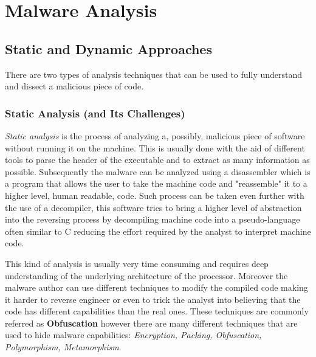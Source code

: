 
\chapter{Malware Analysis}


\section{Static and Dynamic Approaches}
There are two types of analysis techniques that can be used to fully understand and dissect a malicious piece of code.

\subsection*{Static Analysis (and Its Challenges)}

\textit{Static analysis} is the process of analyzing a, possibly, malicious piece of software without running it on the machine. This is usually done with the aid of different tools to parse the header of the executable and to extract as many information as possible. Subsequently the malware can be analyzed using a disassembler which is a program that allows the user to take the machine code and "reassemble" it to a higher level, human readable, code. Such process can be taken even further with the use of a decompiler, this software tries to bring a higher level of abstraction into the reversing process by decompiling machine code into a pseudo-language often similar to C reducing the effort required by the analyst to interpret machine code.

This kind of analysis is usually very time consuming and requires deep understanding of the underlying architecture of the processor. Moreover the malware author can use different techniques to modify the compiled code making it harder to reverse engineer or even to trick the analyst into believing that the code has different capabilities than the real ones. These techniques are commonly referred as \textbf{Obfuscation} however there are many different techniques that are used to hide malware capabilities: \textit{Encryption, Packing, Obfuscation, Polymorphism, Metamorphism}.\cite{Ye2017ASO}


